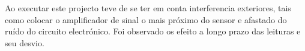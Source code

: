 \begin{columns}
{{\begin{minipage}[b!]{\linewidth}
\begin{minipage}[b!]{.2\linewidth}
			\end{minipage}
			\begin{minipage}[b!]{.6\linewidth}
				Ao executar este projecto teve de se ter em conta interferencia exteriores, tais como colocar o amplificador de sinal o mais próximo do sensor e afastado do ruído do circuito electrónico. Foi observado os efeito a longo prazo das leituras e seu desvio.
				\vspace{1cm}
			\end{minipage}
		\end{minipage}
	}
	\vspace{5cm}
}
\end{columns}
